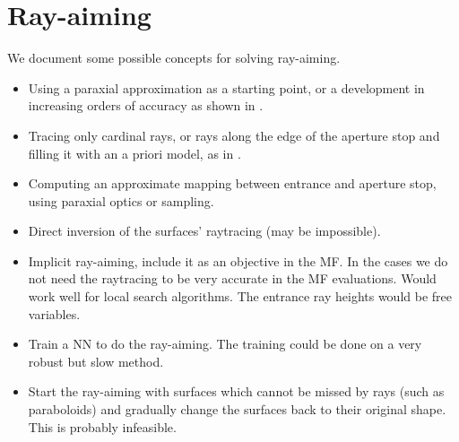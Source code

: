 \section{Ray-aiming}
We document some possible concepts for solving ray-aiming.

\begin{itemize}
\item Using a paraxial approximation as a starting point, or a development
      in increasing orders of accuracy as shown in \cite{Zheng2010}.
\item Tracing only cardinal rays, or rays along the edge of the aperture
      stop and filling it with an a priori model, as in \cite{Houllier-thesis}.
\item Computing an approximate mapping between entrance and aperture stop,
      using paraxial optics or sampling.
\item Direct inversion of the surfaces' raytracing (may be impossible).
\item Implicit ray-aiming, include it as an objective in the MF. In the
      cases we do not need the raytracing to be very accurate in the MF
      evaluations. Would work well for local search algorithms. The
      entrance ray heights would be free variables.
\item Train a NN to do the ray-aiming. The training could be done on
      a very robust but slow method.
\item Start the ray-aiming with surfaces which cannot be missed by rays (such as
      paraboloids) and gradually change the surfaces back to their original shape.
      This is probably infeasible.
\end{itemize}
